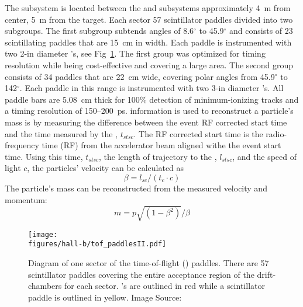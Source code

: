 The  subsystem is located between the  and  subsystems approximately 4~m from  center, 5~m from the  target. Each sector 57 scintillator paddles divided into two subgroups. The first subgroup subtends angles of 8.6$^\circ$ to 45.9$^\circ$ and consists of 23 scintillating paddles that are 15~cm in width. Each paddle is instrumented with two 2-in diameter 's, see Fig~\ref{fig:clas.tof.paddles}. The first group was optimized for timing resolution while being cost-effective and covering a large area. The second group consists of 34 paddles that are 22~cm wide, covering polar angles from 45.9$^\circ$ to 142$^\circ$. Each paddle in this range is instrumented with two 3-in diameter 's. All paddle bars are 5.08~cm thick for 100\% detection of minimum-ionizing tracks and a timing resolution of 150--200~ps.
 information is used to reconstruct a particle's mass is by measuring the difference between the event RF corrected start time and the time measured by the , $t_{stsc}$. The RF corrected start time is the radio-frequency time (RF) from the accelerator beam aligned withe the event start time. Using this time, $t_{stsc}$, the length of trajectory to the , $l_{stsc}$, and the speed of light $c$, the particles' velocity can be calculated as
\begin{equation}\label{eq:beta.cal}
\beta = l_{sc}/(t_{c}\cdot c)
\end{equation}
The particle's mass can be reconstructed from the measured velocity and momentum:
\begin{equation}\label{eq:mass.cal}
m = p\sqrt{(1-\beta^2)}/\beta
\end{equation}

\begin{figure}\begin{center}
\texttt{[image: \\figures/hall-b/tof\_paddlesII.pdf]}
\caption[Diagram of one sector of the time-of-flight () paddles]{\label{fig:clas.tof.paddles}Diagram of one sector of the time-of-flight () paddles. There are 57 scintillator paddles covering the entire acceptance region of the drift-chambers for each sector. 's are outlined in red while a scintillator paddle is outlined in yellow.  Image Source:~\cite{clas.tof}}
\end{center}\end{figure}

